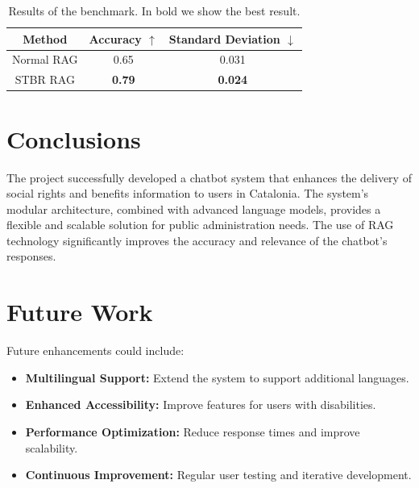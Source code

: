 \documentclass[a4paper,12pt,oneside]{ThesisStyle}
\begin{document}
\begin{table}[H]
  \centering
  \begin{tabular}{|c|c|c|}
    \hline
    \textbf{Method} & \textbf{Accuracy \(\uparrow\)} & \textbf{Standard Deviation \(\downarrow\)} \\
    \hline
    Normal RAG      & 0.65                           & 0.031                                      \\
    STBR RAG        & \textbf{0.79}                  & \textbf{0.024}                             \\       
    \hline
  \end{tabular}
  \caption{Results of the benchmark. In bold we show the best result.}
  \label{tab:benchmark_results}
\end{table}

\section{Conclusions}
\label{sec:conclusions}

The project successfully developed a chatbot system that enhances the delivery of social rights and benefits information to users in Catalonia. The system's modular architecture, combined with advanced language models, provides a flexible and scalable solution for public administration needs. The use of RAG technology significantly improves the accuracy and relevance of the chatbot's responses.

\section{Future Work}
\label{sec:future_work}

Future enhancements could include:

\begin{itemize}
    \item \textbf{Multilingual Support:} Extend the system to support additional languages.
    \item \textbf{Enhanced Accessibility:} Improve features for users with disabilities.
    \item \textbf{Performance Optimization:} Reduce response times and improve scalability.
    \item \textbf{Continuous Improvement:} Regular user testing and iterative development.
\end{itemize}
\end{document}

